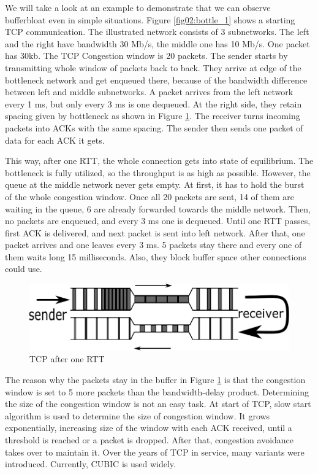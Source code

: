 We will take a look at an example to demonstrate that we can observe bufferbloat even in simple situations. Figure \ref{fig02:bottle_1} shows a starting TCP communication. The illustrated network consists of 3 subnetworks. The left and the right have bandwidth 30 Mb/s, the middle one has 10 Mb/s. One packet has 30kb. The TCP Congestion window is 20 packets. The sender starts by transmitting whole window of packets back to back. They arrive at edge of the bottleneck network and get enqueued there, because of the bandwidth difference between left and middle subnetworks. A packet arrives from the left network every 1 ms, but only every 3 ms is one dequeued. At the right side, they retain spacing given by bottleneck as shown in Figure \ref{fig03:bottle_2}. The receiver turns incoming packets into ACKs with the same spacing. The sender then sends one packet of data for each ACK it gets.

This way, after one RTT, the whole connection gets into state of equilibrium. The bottleneck is fully utilized, so the throughput is as high as possible. However, the queue at the middle network never gets empty. At first, it has to hold the burst of the whole congestion window. Once all 20 packets are sent, 14 of them are waiting in the queue, 6 are already forwarded towards the middle network. Then, no packets are enqueued, and every 3 ms one is dequeued. Until one RTT passes, first ACK is delivered, and next packet is sent into left network. After that, one packet arrives and one leaves every 3 ms. 5 packets stay there and every one of them waits long 15 milliseconds. Also, they block buffer space other connections could use. 

\begin{figure}
	\centering
	\includegraphics[width=137mm]{drawings/tcp_bottleneck_2}
	\caption{TCP after one RTT}
	
	\label{fig03:bottle_2}
\end{figure}

The reason why the packets stay in the buffer in Figure \ref{fig03:bottle_2} is that the congestion window is set to 5 more packets than the bandwidth-delay product. Determining the size of the congestion window is not an easy task. At start of TCP, slow start algorithm \cite{Jacobson:1988:CAC:52324.52356} is used to determine the size of congestion window. It grows exponentially, increasing size of the window with each ACK received, until a threshold is reached or a packet is dropped. After that, congestion avoidance takes over to maintain it. Over the years of TCP in service, many variants were introduced. Currently, CUBIC \cite{CUBIC} is used widely. 

